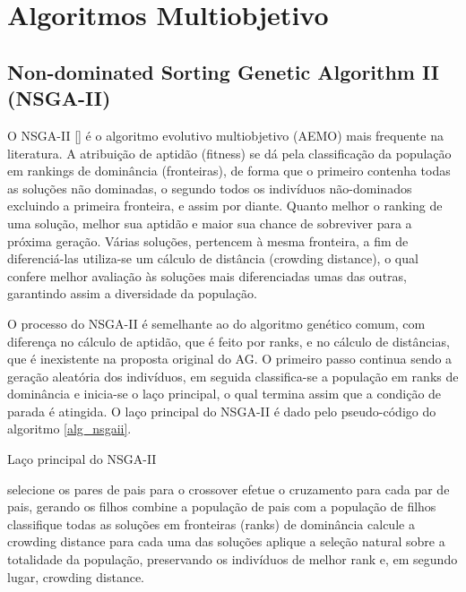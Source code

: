 \section{Algoritmos Multiobjetivo}

\subsection{Non-dominated Sorting Genetic Algorithm II (NSGA-II)}
O NSGA-II [] é o algoritmo evolutivo multiobjetivo (AEMO) mais frequente na literatura. A atribuição de aptidão (fitness) se dá pela classificação da população em rankings de dominância (fronteiras), de forma que o primeiro contenha todas as soluções não dominadas, o segundo todos os indivíduos não-dominados excluindo a primeira fronteira, e assim por diante. Quanto melhor o ranking de uma solução, melhor sua aptidão e  maior sua chance de sobreviver para a próxima geração. Várias soluções, pertencem à mesma fronteira, a fim de diferenciá-las utiliza-se um cálculo de distância (crowding distance), o qual confere melhor avaliação às soluções mais diferenciadas umas das outras, garantindo assim a diversidade da população.

O processo do NSGA-II é semelhante ao do algoritmo genético comum, com diferença no cálculo de aptidão, que é feito por ranks, e no cálculo de distâncias, que é inexistente na proposta original do AG. O primeiro passo continua sendo a geração aleatória dos indivíduos, em seguida classifica-se a população em ranks de dominância e inicia-se o laço principal, o qual termina assim que a condição de parada é atingida. O laço principal do NSGA-II é dado pelo pseudo-código do algoritmo \ref{alg_nsgaii}.

\begin{algorithm}
	\caption{Laço principal do NSGA-II}
	\label{alg_nsgaii}
	\begin{algorithmic}[1]
		\State selecione os pares de pais para o crossover
		\State efetue o cruzamento para cada par de pais, gerando os filhos
		\State combine a população de pais com a população de filhos
		\State classifique todas as soluções em fronteiras (ranks) de dominância 
		\State calcule a crowding distance para cada uma das soluções
		\State aplique a seleção natural sobre a totalidade da população, preservando os indivíduos de melhor rank e, em segundo lugar, crowding distance.
		\EndWhile
	\end{algorithmic}
\end{algorithm}

